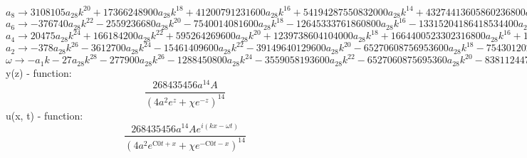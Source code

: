 \documentclass[12pt,a4paper,draft]{article}
\begin{document}
$a_{8}\to 3108105 a_{28} k^{20}+17366248900 a_{28} k^{18}+41200791231600 a_{28} k^{16}+54194287550832000 a_{28} k^{14}+43274413605860236800 a_{28} k^{12}+21573014398699967723520 a_{28} k^{10}+6641286454681660250726400 a_{28} k^8+1200406195403584484376821760 a_{28} k^6+113858041764699560266806067200 a_{28} k^4+4397489007725719237960610611200 a_{28} k^2+30136955531352391936066352840704 a_{28}$\\
$a_{6}\to -376740 a_{28} k^{22}-2559236680 a_{28} k^{20}-7540014081600 a_{28} k^{18}-12645333761860800 a_{28} k^{16}-13315204186418534400 a_{28} k^{14}-9152187926721198428160 a_{28} k^{12}-4132356016246366378229760 a_{28} k^{10}-1200406195403584484376821760 a_{28} k^8-212535011294105845831371325440 a_{28} k^6-20521615369386689777149516185600 a_{28} k^4-843834754877866974209857879539712 a_{28} k^2-6533886871718821770637077657944064 a_{28}$\\
$a_{4}\to 20475 a_{28} k^{24}+166184200 a_{28} k^{22}+595264269600 a_{28} k^{20}+1239738604104000 a_{28} k^{18}+1664400523302316800 a_{28} k^{16}+1508602405503494246400 a_{28} k^{14}+939171821874174176870400 a_{28} k^{12}+400135398467861494792273920 a_{28} k^{10}+113858041764699560266806067200 a_{28} k^8+20521615369386689777149516185600 a_{28} k^6+2109586887194667435524644698849280 a_{28} k^4+98008303075782326559556164869160960 a_{28} k^2+940233544042248836595276196714905600 a_{28}$\\
$a_{2}\to -378 a_{28} k^{26}-3612700 a_{28} k^{24}-15461409600 a_{28} k^{22}-39149640129600 a_{28} k^{20}-65270608756953600 a_{28} k^{18}-75430120275174712320 a_{28} k^{16}-61923416826868627046400 a_{28} k^{14}-36375945315260135890206720 a_{28} k^{12}-15181072235293274702240808960 a_{28} k^{10}-4397489007725719237960610611200 a_{28} k^8-843834754877866974209857879539712 a_{28} k^6-98008303075782326559556164869160960 a_{28} k^4-5641401264253493019571657180289433600 a_{28} k^2-80282173957507810311249795911516160000 a_{28}$\\
$\omega \to -a_{1} k-27 a_{28} k^{28}-277900 a_{28} k^{26}-1288450800 a_{28} k^{24}-3559058193600 a_{28} k^{22}-6527060875695360 a_{28} k^{20}-8381124475019412480 a_{28} k^{18}-7740427103358578380800 a_{28} k^{16}-5196563616465733698600960 a_{28} k^{14}-2530178705882212450373468160 a_{28} k^{12}-879497801545143847592122122240 a_{28} k^{10}-210958688719466743552464469884928 a_{28} k^8-32669434358594108853185388289720320 a_{28} k^6-2820700632126746509785828590144716800 a_{28} k^4-80282173957507810311249795911516160000 a_{28} k^2+3064955119562036944525570043019264000000 a_{28}$\\


y(z) - function:
$$
\frac{268435456 a^{14} A}{\left(4 a^2 e^z+\chi  e^{-z}\right)^{14}}
$$
u(x, t) - function:
$$
\frac{268435456 a^{14} A e^{i (k x-\omega  t)}}{\left(4 a^2 e^{\text{C0} t+x}+\chi  e^{-\text{C0} t-x}\right)^{14}}
$$
\end{document}
